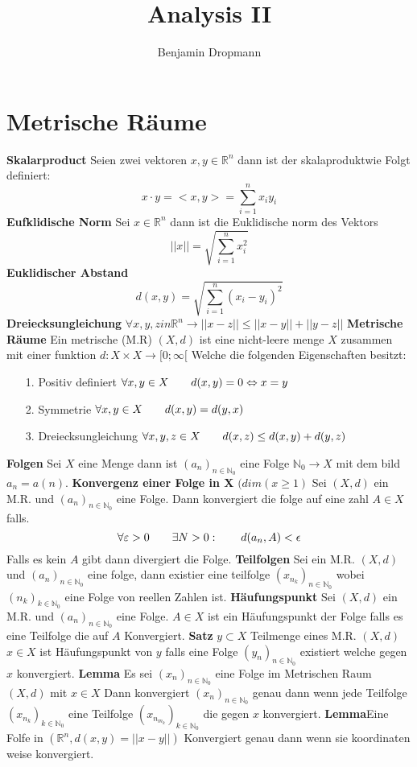 \documentclass{article}
\author{Benjamin Dropmann}
\title{Analysis II}
\newcommand{\mspc}{\hspace{0.7cm}}
\begin{document}
\maketitle

\section{Metrische Räume}
\textbf{Skalarproduct} Seien zwei vektoren $x,y\in\mathbb{R}^n$ dann ist der skalaproduktwie Folgt definiert: \[x\cdot y=<x,y>=\sum_{i=1}^nx_iy_i\]
\textbf{Eufklidische Norm} Sei $x\in \mathbb{R}^n$ dann ist die Euklidische norm des Vektors \[||x||=\sqrt{\sum_{i=1}^nx_i^2}\]
\textbf{Euklidischer Abstand  } \[d(x,y)=\sqrt{\sum^n_{i=1}(x_i-y_i)^2}\]
\textbf{Dreiecksungleichung  }$\forall x,y,zin\mathbb{R}^n\rightarrow||x-z||\le||x-y||+||y-z||$
\textbf{Metrische Räume} Ein metrische (M.R) $(X,d)$ ist eine nicht-leere menge $X$ zusammen mit einer funktion $d:X\times X\rightarrow[0;\infty[$ Welche die folgenden Eigenschaften besitzt:
\begin{itemize}
\item[1.]{Positiv definiert $\forall x,y\in X\mspc d(x,y)=0\Leftrightarrow x=y$}
\item[2.]{Symmetrie $\forall x,y \in X\mspc d(x,y)=d(y,x)$}
\item[3.]{Dreiecksungleichung $\forall x,y,z\in X\mspc d(x,z)\le d(x,y)+d(y,z)$}
\end{itemize}
\textbf{Folgen} Sei $X$ eine Menge dann ist $(a_n)_{n\in\mathbb{N}_0}$ eine Folge $\mathbb{N}_0\rightarrow X$ mit dem bild $a_n=a(n)$.\newline
\textbf{Konvergenz einer Folge in X} $(dim(x\ge1)$ Sei $(X,d)$ ein M.R. und $(a_n)_{n\in\mathbb{N}_0}$ eine Folge.  Dann konvergiert die folge auf eine zahl $A\in X$ falls.
\[\forall\varepsilon>0\mspc\exists N>0:\mspc d(a_n,A)<\epsilon\]
Falls es kein $A$ gibt dann divergiert die Folge.\newline
\textbf{Teilfolgen} Sei ein M.R. $(X,d)$ und $(a_n)_{n\in\mathbb{N}_0}$ eine folge, dann existier eine teilfolge $(x_{n_k})_{n\in\mathbb{N}_0}$ wobei $(n_k)_{k\in\mathbb{N}_0}$ eine Folge von reellen Zahlen ist.\newline
\textbf{Häufungspunkt} Sei $(X,d)$ ein M.R. und $(a_n)_{n\in\mathbb{N}_0}$ eine Folge. $A\in X$ ist ein Häufungspunkt der Folge falls es eine Teilfolge die auf $A$ Konvergiert.\newline
\textbf{Satz} $y\subset X$ Teilmenge eines M.R. $(X,d)$ $x\in X$ ist Häufungspunkt von $y$ falls eine Folge $(y_n)_{n\in\mathbb{N}_0}$ existiert welche gegen $x$ konvergiert.
\newline\textbf{Lemma} Es sei $(x_n)_{n\in\mathbb{N}_0}$ eine Folge im Metrischen Raum $(X,d)$ mit $x\in X$ Dann konvergiert $(x_n)_{n\in\mathbb{N}_0}$ genau dann wenn jede Teilfolge $(x_{n_k})_{k\in\mathbb{N}_0}$ eine Teilfolge $(x_{n_{m_k}})_{k\in\mathbb{N}_0}$ die gegen $x$ konvergiert.
\newline\textbf{Lemma}Eine Folfe in $(\mathbb{R}^n, d(x,y)=||x-y||)$ Konvergiert genau dann wenn sie koordinaten weise konvergiert.
\end{document}

